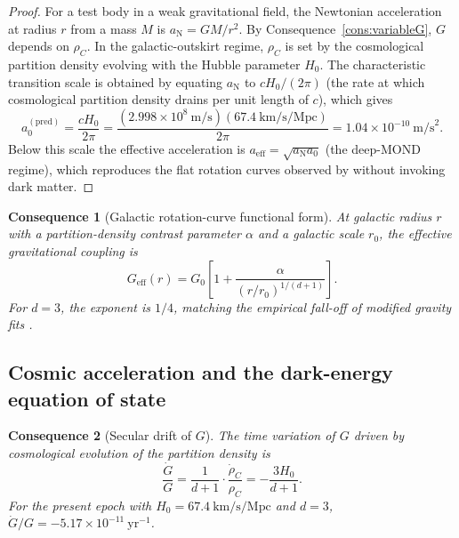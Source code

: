 \documentclass[11pt,twocolumn,a4paper]{article}
\theoremstyle{axiomstyle}
\theoremstyle{conseqstyle}
\newtheorem{consequence}{Consequence}
\theoremstyle{definition}
\theoremstyle{remark}
\begin{document}
\begin{proof}
For a test body in a weak gravitational field, the Newtonian acceleration at radius $r$ from a mass $M$ is $a_{\mathrm{N}}=GM/r^{2}$. By Consequence~\ref{cons:variableG}, $G$ depends on $\rho_{C}$. In the galactic-outskirt regime, $\rho_{C}$ is set by the cosmological partition density evolving with the Hubble parameter $H_{0}$. The characteristic transition scale is obtained by equating $a_{\mathrm{N}}$ to $cH_{0}/(2\pi)$ (the rate at which cosmological partition density drains per unit length of $c$), which gives
\begin{equation}
a_{0}^{(\mathrm{pred})}=\frac{cH_{0}}{2\pi}=\frac{(2.998\times10^{8}~\mathrm{m/s})(67.4~\mathrm{km/s/Mpc})}{2\pi}=1.04\times10^{-10}~\mathrm{m/s}^{2}.
\end{equation}
Below this scale the effective acceleration is $a_{\mathrm{eff}}=\sqrt{a_{\mathrm{N}}a_{0}}$ (the deep-MOND regime), which reproduces the flat rotation curves observed by \citet{rubin1980} without invoking dark matter.
\end{proof}

\begin{consequence}[Galactic rotation-curve functional form]\label{cons:rotationcurves}
At galactic radius $r$ with a partition-density contrast parameter $\alpha$ and a galactic scale $r_{0}$, the effective gravitational coupling is
\begin{equation}
G_{\mathrm{eff}}(r)=G_{0}\!\left[1+\frac{\alpha}{(r/r_{0})^{1/(d+1)}}\right].
\end{equation}
For $d=3$, the exponent is $1/4$, matching the empirical fall-off of modified gravity fits \citep{famaey2012}.
\end{consequence}

\subsection{Cosmic acceleration and the dark-energy equation of state}

\begin{consequence}[Secular drift of $G$]\label{cons:secularG}
The time variation of $G$ driven by cosmological evolution of the partition density is
\begin{equation}
\frac{\dot G}{G}=\frac{1}{d+1}\cdot\frac{\dot\rho_{C}}{\rho_{C}}=-\frac{3H_{0}}{d+1}.
\end{equation}
For the present epoch with $H_{0}=67.4~\mathrm{km/s/Mpc}$ and $d=3$, $\dot G/G=-5.17\times10^{-11}~\mathrm{yr}^{-1}$.
\end{consequence}
\end{document}
